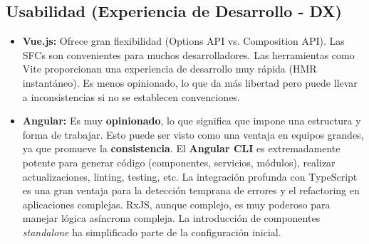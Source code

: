 \documentclass[11pt, a4paper]{article}
\begin{document}
\subsection{Usabilidad (Experiencia de Desarrollo - DX)}
\begin{itemize}
    \item \textbf{Vue.js:} Ofrece gran flexibilidad (Options API vs. Composition API). Las SFCs son convenientes para muchos desarrolladores. Las herramientas como Vite proporcionan una experiencia de desarrollo muy rápida (HMR instantáneo). Es menos opinionado, lo que da más libertad pero puede llevar a inconsistencias si no se establecen convenciones.
    \item \textbf{Angular:} Es muy \textbf{opinionado}, lo que significa que impone una estructura y forma de trabajar. Esto puede ser visto como una ventaja en equipos grandes, ya que promueve la \textbf{consistencia}. El \textbf{Angular CLI} es extremadamente potente para generar código (componentes, servicios, módulos), realizar actualizaciones, linting, testing, etc. La integración profunda con TypeScript es una gran ventaja para la detección temprana de errores y el refactoring en aplicaciones complejas. RxJS, aunque complejo, es muy poderoso para manejar lógica asíncrona compleja. La introducción de componentes \textit{standalone} ha simplificado parte de la configuración inicial.
\end{itemize}

\end{document}
